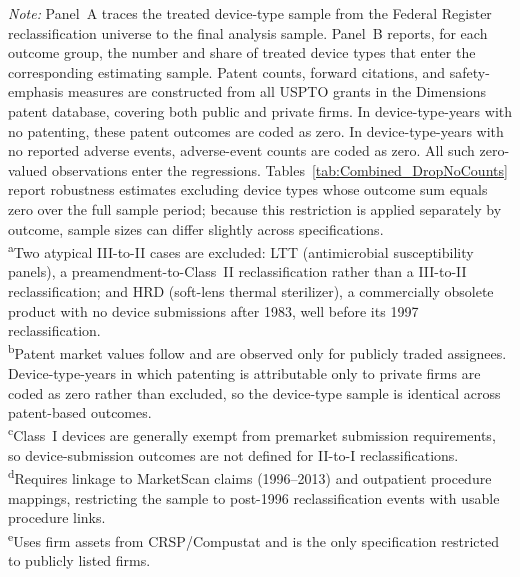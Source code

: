 \begin{table}[h!]
\caption*{\footnotesize
\textit{Note:} Panel~A traces the treated device-type sample from the Federal Register reclassification universe to the final analysis sample. Panel~B reports, for each outcome group, the number and share of treated device types that enter the corresponding estimating sample. Patent counts, forward citations, and safety-emphasis measures are constructed from all USPTO grants in the Dimensions patent database, covering both public and private firms. In device-type-years with no patenting, these patent outcomes are coded as zero. In device-type-years with no reported adverse events, adverse-event counts are coded as zero. All such zero-valued observations enter the regressions. Tables~\ref{tab:Combined_DropNoCounts} report robustness estimates excluding device types whose outcome sum equals zero over the full sample period; because this restriction is applied separately by outcome, sample sizes can differ slightly across specifications.\\[3pt]
\textsuperscript{a}Two atypical III-to-II cases are excluded: LTT (antimicrobial susceptibility panels), a preamendment-to-Class~II reclassification rather than a III-to-II reclassification; and HRD (soft-lens thermal sterilizer), a commercially obsolete product with no device submissions after 1983, well before its 1997 reclassification.\\
\textsuperscript{b}Patent market values follow \citet{kogan:2017} and are observed only for publicly traded assignees. Device-type-years in which patenting is attributable only to private firms are coded as zero rather than excluded, so the device-type sample is identical across patent-based outcomes.\\
\textsuperscript{c}Class~I devices are generally exempt from premarket submission requirements, so device-submission outcomes are not defined for II-to-I reclassifications.\\
\textsuperscript{d}Requires linkage to MarketScan claims (1996--2013) and outpatient procedure mappings, restricting the sample to post-1996 reclassification events with usable procedure links.\\
\textsuperscript{e}Uses firm assets from CRSP/Compustat and is the only specification restricted to publicly listed firms.}
\end{table}